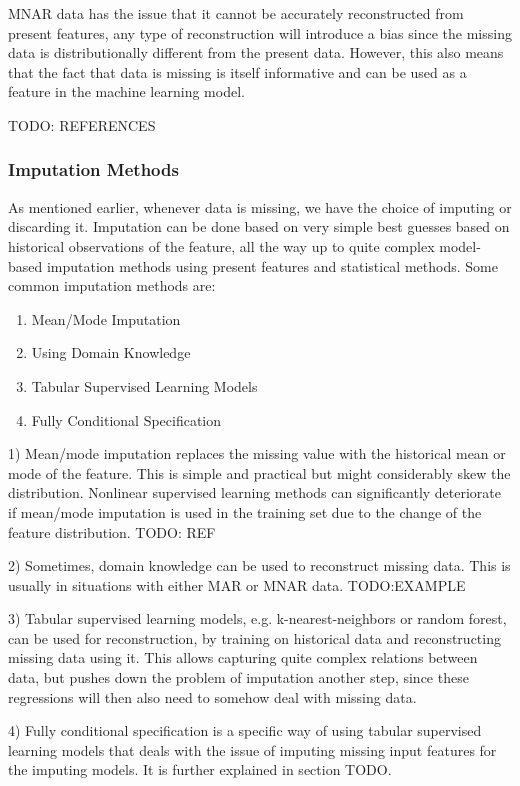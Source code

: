 MNAR data has the issue that it cannot be accurately reconstructed from present
features, any type of reconstruction will introduce a bias since the missing
data is distributionally different from the present data. However, this also
means that the fact that data is missing is itself informative and can be used
as a feature in the machine learning model.

TODO: REFERENCES
\subsubsection{Imputation Methods}

As mentioned earlier, whenever data is missing, we have the choice of imputing or
discarding it. Imputation can be done based on very simple best guesses based
on historical observations of the feature, all the way up to quite complex
model-based imputation methods using present features and statistical methods.
Some common imputation methods are:

\begin{enumerate}
  \item Mean/Mode Imputation
  \item Using Domain Knowledge
  \item Tabular Supervised Learning Models
  \item Fully Conditional Specification
\end{enumerate}

1) Mean/mode imputation replaces the missing value with the historical mean or
mode of the feature. This is simple and practical but might considerably
skew the distribution. Nonlinear supervised learning methods can
significantly deteriorate if mean/mode imputation is used in the training
set due to the change of the feature distribution. TODO: REF

2) Sometimes, domain knowledge can be used to reconstruct missing data. This is
usually in situations with either MAR or MNAR data. TODO:EXAMPLE

3) Tabular supervised learning models, e.g. k-nearest-neighbors or random
forest, can be used for reconstruction, by training on historical data and
reconstructing missing data using it. This allows capturing quite complex
relations between data, but pushes down the problem of imputation another
step, since these regressions will then also need to somehow deal with
missing data.

4) Fully conditional specification is a specific way of using tabular
supervised learning models that deals with the issue of imputing missing
input features for the imputing models. It is further explained in section
TODO.

